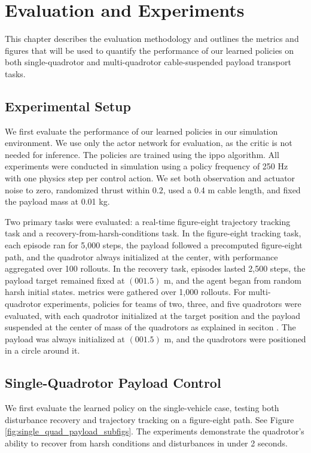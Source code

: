 \chapter{Evaluation and Experiments}

This chapter describes the evaluation methodology and outlines the metrics and figures that will be used to quantify the performance of our learned policies on both single-quadrotor and multi-quadrotor cable-suspended payload transport tasks.

\section{Experimental Setup}
We first evaluate the performance of our learned policies in our simulation environment. We use only the actor network for evaluation, as the critic is not needed for inference. The policies are trained using the \gls{ippo} algorithm.
All experiments were conducted in simulation using a policy frequency of 250 Hz with one physics step per control action. We set both observation and actuator noise to zero, randomized thrust within $0.2$, used a 0.4 m cable length, and fixed the payload mass at 0.01 kg. 

Two primary tasks were evaluated: a real-time figure-eight trajectory tracking task and a recovery-from-harsh-conditions task. In the figure-eight tracking task, each episode ran for 5,000 steps, the payload followed a precomputed figure-eight path, and the quadrotor always initialized at the center, with performance aggregated over 100 rollouts. In the recovery task, episodes lasted 2,500 steps, the payload target remained fixed at $(0 0 1.5)$ m, and the agent began from random harsh initial states. metrics were gathered over 1,000 rollouts. For multi-quadrotor experiments, policies for teams of two, three, and five quadrotors were evaluated, with each quadrotor initialized at the target position and the payload suspended at the center of mass of the quadrotors as explained in seciton . The payload was always initialized at $(0 0 1.5)$ m, and the quadrotors were positioned in a circle around it.

\section{Single-Quadrotor Payload Control}
We first evaluate the learned policy on the single-vehicle case, testing both disturbance recovery and trajectory tracking on a figure-eight path. See Figure \ref{fig:single_quad_payload_subfigs}.
The experiments demonstrate the quadrotor's ability to recover from harsh conditions and disturbances in under 2 seconds. 

